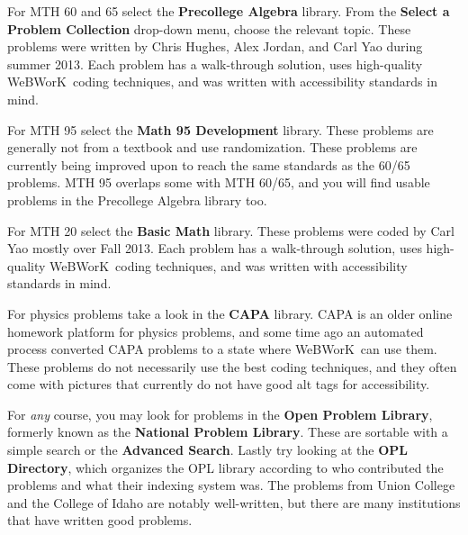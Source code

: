 \documentclass[12pt]{article}
\newcommand{\menu}[1]{\textbf{#1}}
\newcommand{\WW}{WeBWorK}
\begin{document}
\begin{description}
\item{For MTH 60 and 65} select the \menu{Precollege Algebra} library.  From the \menu{Select a Problem Collection} drop-down menu, choose the relevant topic. These problems were written by Chris Hughes, Alex Jordan, and Carl Yao during summer 2013. Each problem has a walk-through solution, uses high-quality \WW\ coding techniques, and was written with accessibility standards in mind.

\item{For MTH 95} select the \menu{Math 95 Development} library.  These problems are generally not from a textbook and use randomization.  These problems are currently being improved upon to reach the same standards as the 60/65 problems. MTH 95 overlaps some with MTH 60/65, and you will find usable problems in the Precollege Algebra library too.

\item{For MTH 20} select the \menu{Basic Math} library.  These problems were coded by Carl Yao mostly over Fall 2013. Each problem has a walk-through solution, uses high-quality \WW\ coding techniques, and was written with accessibility standards in mind.


\item{For physics problems} take a look in the \menu{CAPA} library. CAPA is an older online homework platform for physics problems, and some time ago an automated process converted CAPA problems to a state where \WW\ can use them. These problems do not necessarily use the best coding techniques, and they often come with pictures that currently do not have good alt tags for accessibility.

\item{For \emph{any} course,} you may look for problems in the \menu{Open Problem Library}, formerly known as the \menu{National Problem Library}.  These are sortable with a simple search or the \menu{Advanced Search}.  Lastly try looking at the \menu{OPL Directory}, which organizes the OPL library according to who contributed the problems and what their indexing system was. The problems from Union College and the College of Idaho are notably well-written, but there are many institutions that have written good problems.
\end{description}
\end{document}
